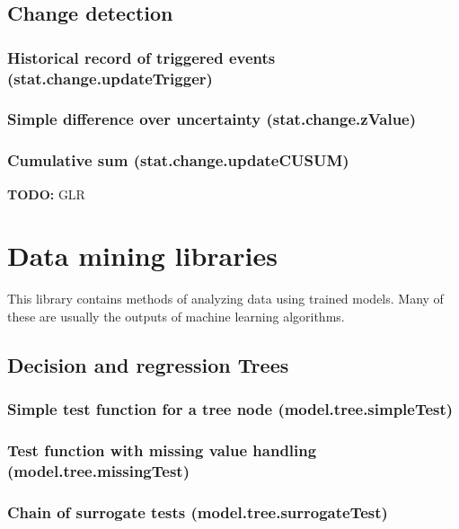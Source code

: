 \documentclass{article}
\theoremstyle{definition}
\begin{document}
\subsection{Change detection}

\subsubsection{Historical record of triggered events (stat.change.updateTrigger)}

\subsubsection{Simple difference over uncertainty (stat.change.zValue)}

\subsubsection{Cumulative sum (stat.change.updateCUSUM)}

{\bf TODO:} GLR

\pagebreak

\section{Data mining libraries}

This library contains methods of analyzing data using trained models.  Many of these are usually the outputs of machine learning algorithms.

\subsection{Decision and regression Trees}

\subsubsection{Simple test function for a tree node (model.tree.simpleTest)}

\subsubsection{Test function with missing value handling (model.tree.missingTest)}

\subsubsection{Chain of surrogate tests (model.tree.surrogateTest)}
\end{document}
